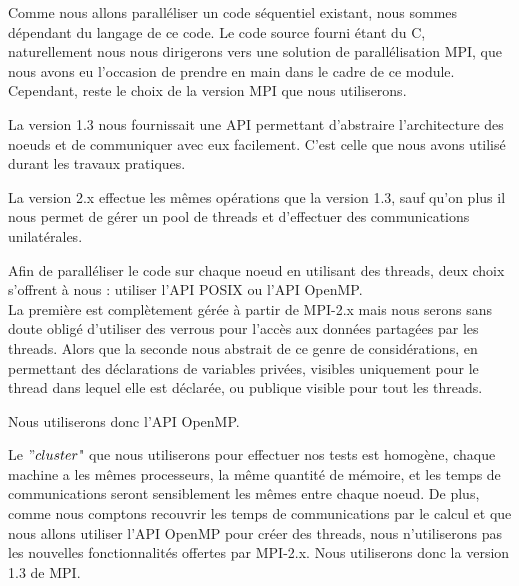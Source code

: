 \par Comme nous allons paralléliser un code séquentiel existant,
nous sommes dépendant du langage de ce code. Le code source fourni 
étant du C, naturellement nous nous dirigerons vers une solution 
de parallélisation MPI, que nous avons eu l'occasion de prendre 
en main dans le cadre de ce module. Cependant, reste le choix de la 
version MPI que nous utiliserons.\\
\par La version 1.3 nous fournissait une API permettant d'abstraire 
l'architecture des noeuds et de communiquer avec eux facilement. C'est
celle que nous avons utilisé durant les travaux pratiques.\\
\par La version 2.x effectue les mêmes opérations que la version 1.3,
sauf qu'on plus il nous permet de gérer un pool de threads et d'effectuer des communications unilatérales.\\
\par Afin de paralléliser le code sur chaque noeud en utilisant des threads,
deux choix s'offrent à nous : utiliser l'API POSIX ou l'API OpenMP.\\
La première est complètement gérée à partir de MPI-2.x mais nous serons sans doute
obligé d'utiliser des verrous pour l'accès aux données partagées par les threads.
Alors que la seconde nous abstrait de ce genre de considérations, en permettant 
des déclarations de variables privées, visibles uniquement pour le thread dans lequel elle est déclarée, ou publique visible pour tout les threads.\\

\par Nous utiliserons donc l'API OpenMP.\\

\par Le $"cluster$" que nous utiliserons pour effectuer nos tests 
est homogène, chaque machine a les mêmes processeurs, la même 
quantité de mémoire, et les temps de communications seront sensiblement 
les mêmes entre chaque noeud. De plus, comme nous comptons recouvrir les temps de communications par le calcul et que nous allons utiliser l'API OpenMP pour créer des threads, nous n'utiliserons pas les nouvelles fonctionnalités offertes
par MPI-2.x. Nous utiliserons donc la version 1.3 de MPI.\\